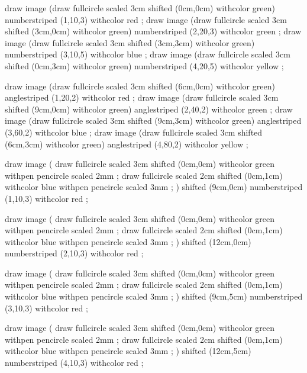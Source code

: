 \startMPpage

draw image (draw fullcircle scaled 3cm shifted (0cm,0cm) withcolor green) numberstriped (1,10,3) withcolor red ;
draw image (draw fullcircle scaled 3cm shifted (3cm,0cm) withcolor green) numberstriped (2,20,3) withcolor green ;
draw image (draw fullcircle scaled 3cm shifted (3cm,3cm) withcolor green) numberstriped (3,10,5) withcolor blue ;
draw image (draw fullcircle scaled 3cm shifted (0cm,3cm) withcolor green) numberstriped (4,20,5) withcolor yellow ;

draw image (draw fullcircle scaled 3cm shifted (6cm,0cm) withcolor green) anglestriped (1,20,2) withcolor red ;
draw image (draw fullcircle scaled 3cm shifted (9cm,0cm) withcolor green) anglestriped (2,40,2) withcolor green ;
draw image (draw fullcircle scaled 3cm shifted (9cm,3cm) withcolor green) anglestriped (3,60,2) withcolor blue ;
draw image (draw fullcircle scaled 3cm shifted (6cm,3cm) withcolor green) anglestriped (4,80,2) withcolor yellow ;

draw image (
    draw fullcircle scaled 3cm shifted (0cm,0cm) withcolor green withpen pencircle scaled 2mm ;
    draw fullcircle scaled 2cm shifted (0cm,1cm) withcolor blue  withpen pencircle scaled 3mm ;
) shifted (9cm,0cm) numberstriped (1,10,3) withcolor red ;

draw image (
    draw fullcircle scaled 3cm shifted (0cm,0cm) withcolor green  withpen pencircle scaled 2mm ;
    draw fullcircle scaled 2cm shifted (0cm,1cm) withcolor blue   withpen pencircle scaled 3mm ;
) shifted (12cm,0cm) numberstriped (2,10,3) withcolor red ;

draw image (
    draw fullcircle scaled 3cm shifted (0cm,0cm) withcolor green  withpen pencircle scaled 2mm ;
    draw fullcircle scaled 2cm shifted (0cm,1cm) withcolor blue   withpen pencircle scaled 3mm ;
) shifted (9cm,5cm) numberstriped (3,10,3) withcolor red ;

draw image (
    draw fullcircle scaled 3cm shifted (0cm,0cm) withcolor green  withpen pencircle scaled 2mm ;
    draw fullcircle scaled 2cm shifted (0cm,1cm) withcolor blue   withpen pencircle scaled 3mm ;
) shifted (12cm,5cm) numberstriped (4,10,3) withcolor red ;








\stopMPpage
